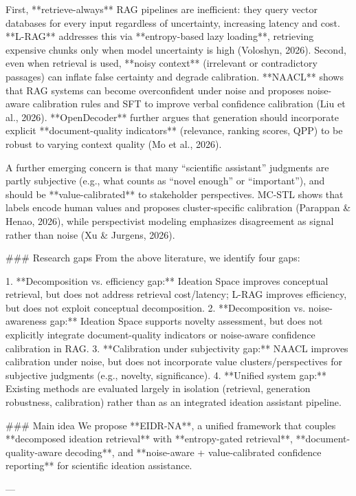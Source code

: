 First, **retrieve-always** RAG pipelines are inefficient: they query vector databases for every input regardless of uncertainty, increasing latency and cost. **L-RAG** addresses this via **entropy-based lazy loading**, retrieving expensive chunks only when model uncertainty is high (Voloshyn, 2026). Second, even when retrieval is used, **noisy context** (irrelevant or contradictory passages) can inflate false certainty and degrade calibration. **NAACL** shows that RAG systems can become overconfident under noise and proposes noise-aware calibration rules and SFT to improve verbal confidence calibration (Liu et al., 2026). **OpenDecoder** further argues that generation should incorporate explicit **document-quality indicators** (relevance, ranking scores, QPP) to be robust to varying context quality (Mo et al., 2026).

A further emerging concern is that many “scientific assistant” judgments are partly subjective (e.g., what counts as “novel enough” or “important”), and should be **value-calibrated** to stakeholder perspectives. MC-STL shows that labels encode human values and proposes cluster-specific calibration (Parappan & Henao, 2026), while perspectivist modeling emphasizes disagreement as signal rather than noise (Xu & Jurgens, 2026).

### Research gaps  
From the above literature, we identify four gaps:

1. **Decomposition vs. efficiency gap:** Ideation Space improves conceptual retrieval, but does not address retrieval cost/latency; L-RAG improves efficiency, but does not exploit conceptual decomposition.  
2. **Decomposition vs. noise-awareness gap:** Ideation Space supports novelty assessment, but does not explicitly integrate document-quality indicators or noise-aware confidence calibration in RAG.  
3. **Calibration under subjectivity gap:** NAACL improves calibration under noise, but does not incorporate value clusters/perspectives for subjective judgments (e.g., novelty, significance).  
4. **Unified system gap:** Existing methods are evaluated largely in isolation (retrieval, generation robustness, calibration) rather than as an integrated ideation assistant pipeline.

### Main idea  
We propose **EIDR-NA**, a unified framework that couples **decomposed ideation retrieval** with **entropy-gated retrieval**, **document-quality-aware decoding**, and **noise-aware + value-calibrated confidence reporting** for scientific ideation assistance.

---

